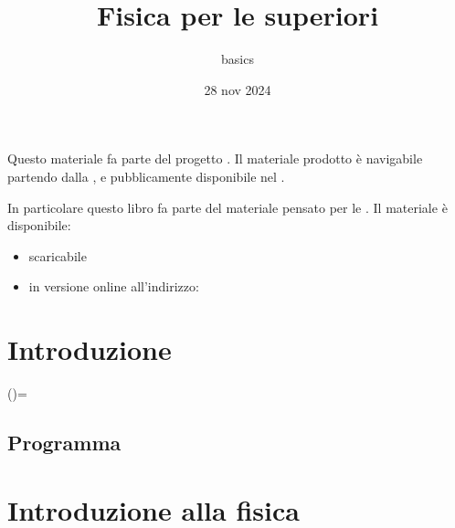 \documentclass[letterpaper,10pt,italian]{jupyterBook}
\title{Fisica per le superiori}
\date{28 nov 2024}
\author{basics}
\begin{document}
\pagestyle{empty}
\sphinxmaketitle
\pagestyle{plain}
\sphinxtableofcontents
\pagestyle{normal}
\label{\detokenize{intro::doc}}


\sphinxAtStartPar
{}
Questo materiale fa parte del progetto . Il materiale prodotto è navigabile partendo dalla , e pubblicamente disponibile nel .

\sphinxAtStartPar
In particolare questo libro fa parte del materiale pensato per le . Il materiale è disponibile:
\begin{itemize}
\item {} 
\sphinxAtStartPar
{} scaricabile

\item {} 
\sphinxAtStartPar
in versione online all’indirizzo: 

\end{itemize}

\sphinxstepscope


\part{Introduzione}

\sphinxstepscope

\sphinxAtStartPar
()=


\chapter{Programma}
\label{\detokenize{ch/program:programma}}\label{\detokenize{ch/program::doc}}
\sphinxstepscope


\part{Introduzione alla fisica}

\sphinxstepscope
\end{document}
